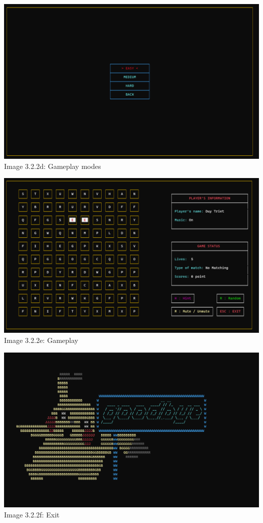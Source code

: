 \documentclass[12pt,a4paper]{report}
\begin{document}
\begin{center}
    \includegraphics[scale=0.3]{Gameplay Modes.png}\\[0.2cm]
    Image 3.2.2d: Gameplay modes
\end{center}
\begin{center}
    \includegraphics[scale=0.3]{Select.png}\\[0.2cm]
    Image 3.2.2e: Gameplay
\end{center}
\begin{center}
    \includegraphics[scale=0.3]{Exit.png}\\[0.2cm]
    Image 3.2.2f: Exit
\end{center}
\newpage
\end{document}
